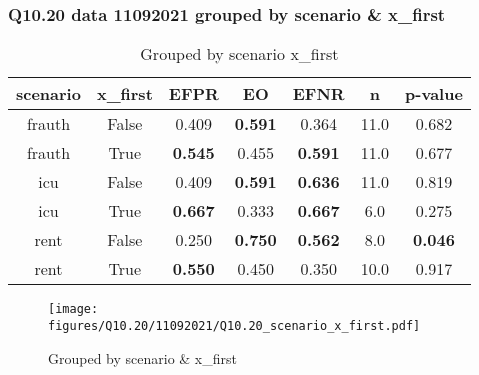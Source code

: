 \subsubsection{Q10.20 data 11092021 grouped by scenario \& x_first}

\begin{comment}
                     EFPR        EO      EFNR     n    pvalue
(frauth, False)  0.409091  0.590909  0.363636  11.0  0.682007
(frauth, True)   0.545455  0.454545  0.590909  11.0  0.676575
(icu, False)     0.409091  0.590909  0.636364  11.0  0.818546
(icu, True)      0.666667  0.333333  0.666667   6.0  0.275234
(rent, False)    0.250000  0.750000  0.562500   8.0  0.045500
(rent, True)     0.550000  0.450000  0.350000  10.0  0.916512
\end{comment}

\begin{table}[h]
    \centering
    \begin{tabular}{|c|c|c|c|c|c|c|}
        \hline
        scenario & x_first & EFPR & EO & EFNR & n & p-value\\
        \hline
        frauth & False & 0.409 & \textbf{0.591} & 0.364 & 11.0 & 0.682\\
		frauth & True & \textbf{0.545} & 0.455 & \textbf{0.591} & 11.0 & 0.677\\
		icu & False & 0.409 & \textbf{0.591} & \textbf{0.636} & 11.0 & 0.819\\
		icu & True & \textbf{0.667} & 0.333 & \textbf{0.667} & 6.0 & 0.275\\
		rent & False & 0.250 & \textbf{0.750} & \textbf{0.562} & 8.0 & \textbf{0.046}\\
		rent & True & \textbf{0.550} & 0.450 & 0.350 & 10.0 & 0.917\\
		
        \hline
    \end{tabular}
    \caption{Grouped by scenario x_first}
    \label{tab:my_label}
\end{table}
\begin{figure}[h]
    \centering
    \texttt{[image: figures/Q10.20/11092021/Q10.20\_scenario\_x\_first.pdf]}
    \caption{Grouped by scenario \& x_first}
    \label{fig:my_label}
\end{figure}
